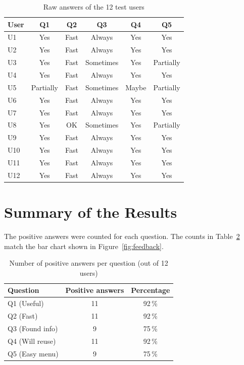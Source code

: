 \begin{table}[h]
\centering
\caption{Raw answers of the 12 test users}
\label{tab:raw-results}
\begin{tabular}{lccccc}
\hline
\textbf{User} & \textbf{Q1} & \textbf{Q2} & \textbf{Q3} & \textbf{Q4} &
\textbf{Q5} \\
\hline
U1  & Yes        & Fast & Always    & Yes   & Yes \\
U2  & Yes        & Fast & Always    & Yes   & Yes \\
U3  & Yes        & Fast & Sometimes & Yes   & Partially \\
U4  & Yes        & Fast & Always    & Yes   & Yes \\
U5  & Partially  & Fast & Sometimes & Maybe & Partially \\
U6  & Yes        & Fast & Always    & Yes   & Yes \\
U7  & Yes        & Fast & Always    & Yes   & Yes \\
U8  & Yes        & OK   & Sometimes & Yes   & Partially \\
U9  & Yes        & Fast & Always    & Yes   & Yes \\
U10 & Yes        & Fast & Always    & Yes   & Yes \\
U11 & Yes        & Fast & Always    & Yes   & Yes \\
U12 & Yes        & Fast & Always    & Yes   & Yes \\
\hline
\end{tabular}
\end{table}

\section{Summary of the Results}
\label{app:summary}

The positive answers were counted for each question. The counts in
Table~\ref{tab:summary-counts} match the bar chart shown in
Figure~\ref{fig:feedback}.

\begin{table}[h]
\centering
\caption{Number of positive answers per question (out of 12 users)}
\label{tab:summary-counts}
\begin{tabular}{lcc}
\hline
\textbf{Question} & \textbf{Positive answers} & \textbf{Percentage} \\
\hline
Q1 (Useful)     & 11 & 92\,\% \\
Q2 (Fast)       & 11 & 92\,\% \\
Q3 (Found info) & 9  & 75\,\% \\
Q4 (Will reuse) & 11 & 92\,\% \\
Q5 (Easy menu)  & 9  & 75\,\% \\
\hline
\end{tabular}
\end{table}

